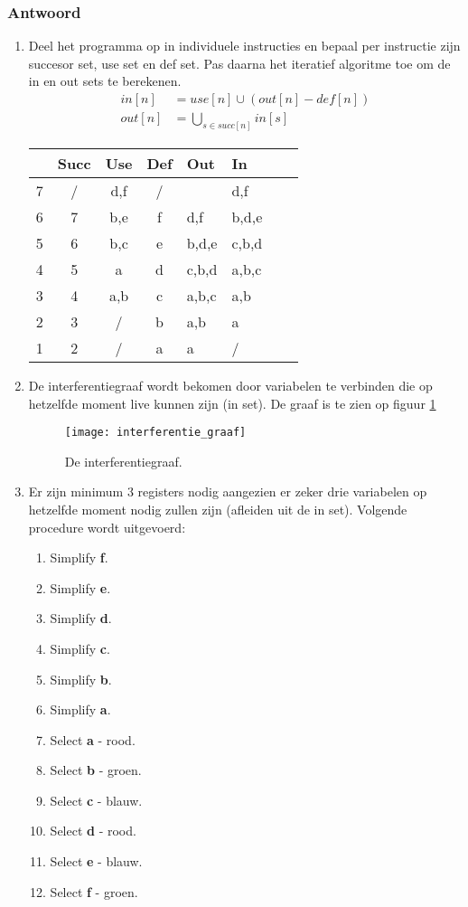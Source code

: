 \documentclass{report}
\newcommand{\answer}[1]{
		\subsubsection*{Antwoord}
			#1
}
\begin{document}
	\answer{
		\begin{enumerate}
			\item Deel het programma op in individuele instructies en bepaal per instructie zijn succesor set, use set en def set. Pas daarna het iteratief algoritme toe om de in en out sets te berekenen.
			\begin{align*}
				in[n] & = use[n] \cup (out[n] - def[n])\\
				out[n] & = \bigcup_{s \in succ[n]} in[s]
			\end{align*}
			\begin{table}[ht]
				\centering
				\begin{tabular}{| c | c c c || l l | l l|}
					\hline
								& Succ & Use & Def & Out        	& In				\\
					\hline
					7          &  /   & d,f &  /  &            	&  d,f   			\\
					6          &  7   & b,e &  f  & d,f        	&  b,d,e		\\
					5          &  6   & b,c &  e  & b,d,e 		&  c,b,d		\\
					4          &  5   &  a  &  d  & c,b,d    	&  a,b,c			\\
					3          &  4   & a,b &  c  & a,b,c     	&  a,b		\\
					2          &  3   &  /  &  b  & a,b     	&  a    		\\
					1          &  2   &  /  &  a  & a        	&  /     		\\
					\hline
				\end{tabular}
			\end{table}
			\item De interferentiegraaf wordt bekomen door variabelen te verbinden die op hetzelfde moment live kunnen zijn (in set). De graaf is te zien op figuur \ref{fig:interferentie_graaf}
			\begin{figure}
				\texttt{[image: interferentie\_graaf]}
				\caption{De interferentiegraaf.}
				\label{fig:interferentie_graaf}
			\end{figure}
			\item Er zijn minimum 3 registers nodig aangezien er zeker drie variabelen op hetzelfde moment nodig zullen zijn (afleiden uit de in set). Volgende procedure wordt uitgevoerd:
			\begin{enumerate}
				\item Simplify \textbf{f}.
				\item Simplify \textbf{e}.
				\item Simplify \textbf{d}.
				\item Simplify \textbf{c}.
				\item Simplify \textbf{b}.
				\item Simplify \textbf{a}.
				\item Select \textbf{a} - rood.
				\item Select \textbf{b} - groen.
				\item Select \textbf{c} - blauw.
				\item Select \textbf{d} - rood.
				\item Select \textbf{e} - blauw.
				\item Select \textbf{f} - groen.


\end{enumerate}
\end{enumerate}}
\end{document}
